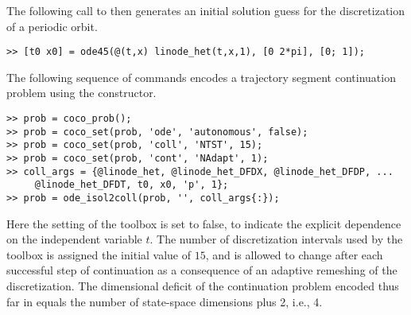 The following call to  then generates an initial solution guess for the discretization of a periodic orbit.
\begin{lstlisting}[language=coco-highlight]
>> [t0 x0] = ode45(@(t,x) linode_het(t,x,1), [0 2*pi], [0; 1]);
\end{lstlisting}

The following sequence of commands encodes a trajectory segment continuation problem using the  constructor.
\begin{lstlisting}[language=coco-highlight]
>> prob = coco_prob();
>> prob = coco_set(prob, 'ode', 'autonomous', false);
>> prob = coco_set(prob, 'coll', 'NTST', 15);
>> prob = coco_set(prob, 'cont', 'NAdapt', 1);
>> coll_args = {@linode_het, @linode_het_DFDX, @linode_het_DFDP, ...
     @linode_het_DFDT, t0, x0, 'p', 1};
>> prob = ode_isol2coll(prob, '', coll_args{:});
\end{lstlisting}
Here the  setting of the  toolbox is set to false, to indicate the explicit dependence on the independent variable $t$. The number of discretization intervals used by the  toolbox is assigned the initial value of $15$, and is allowed to change after each successful step of continuation as a consequence of an adaptive remeshing of the discretization. The dimensional deficit of the continuation problem encoded thus far in  equals the number of state-space dimensions plus 2, i.e., 4.

